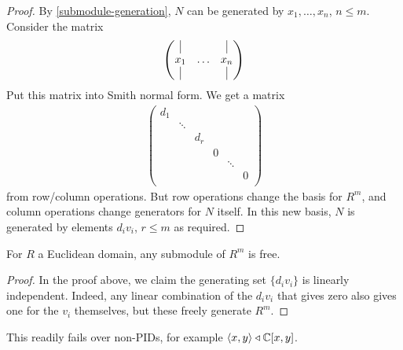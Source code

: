 \documentclass{../../template/note}
\begin{document}
    \begin{proof}
        By \cref{submodule-generation}, $N$ can be generated by $x_1, \dots, x_n$, $n \leq m$. Consider the matrix
        \begin{align*}
            \begin{pmatrix}
                \vline & & \vline \\ 
                x_1 & \dots & x_n \\
                \vline & & \vline \\ 
            \end{pmatrix}
        \end{align*}
        Put this matrix into Smith normal form. We get a matrix
        \begin{align*}
            \begin{pmatrix}
                d_1 &  &  &  &  & \\
                 & \ddots &  &  &  & \\
                 &  & d_r &  &  & \\
                 &  &  & 0 &  &  \\
                 &  &  &  & \ddots & \\
                 &  &  &  &  & 0 \\
            \end{pmatrix}
        \end{align*}
        from row/column operations. But row operations change the basis for $R^m$, and column operations change generators for $N$ itself. In this new basis, $N$ is generated by elements $d_iv_i$, $r \leq m$ as required.
    \end{proof}
    
    \begin{theorem}
        For $R$ a Euclidean domain, any submodule of $R^m$ is free.
    \end{theorem}
    
    \begin{proof}
        In the proof above, we claim the generating set $\{d_iv_i\}$ is linearly independent. Indeed, any linear combination of the $d_iv_i$ that gives zero also gives one for the $v_i$ themselves, but these freely generate $R^m$.
    \end{proof}
    
    \begin{remark*}
        This readily fails over non-PIDs, for example $\left \langle x, y \right \rangle \triangleleft \mathbb C[x, y]$.
    \end{remark*}
    
\end{document}
